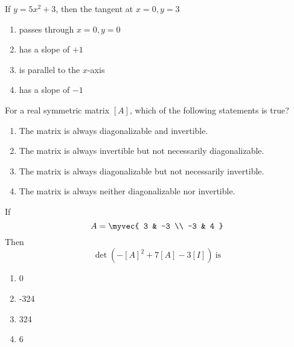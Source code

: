 \item If $y = 5x^{2} + 3$, then the tangent at $x = 0, y = 3$

\begin{enumerate}
    \item passes through $x = 0, y = 0$
    \item has a slope of $+1$
    \item is parallel to the $x$-axis
    \item has a slope of $-1$
\end{enumerate}
\hfill{}
\item For a real symmetric matrix \([A]\), which of the following statements is true?

\begin{enumerate}
    \item The matrix is always diagonalizable and invertible.
    \item The matrix is always invertible but not necessarily diagonalizable.
    \item The matrix is always diagonalizable but not necessarily invertible.
    \item The matrix is always neither diagonalizable nor invertible.
\end{enumerate}
\hfill{}

\item  
If  
$$
A = \myvec{
3 & -3 \\
-3 & 4
}
$$
Then  
$$
\det\left(-[A]^2 + 7[A] - 3[I] \right) \ \text{is}
$$
\begin{enumerate}
    \item 0
    \item -324
    \item 324
    \item 6
\end{enumerate}
\hfill{}

